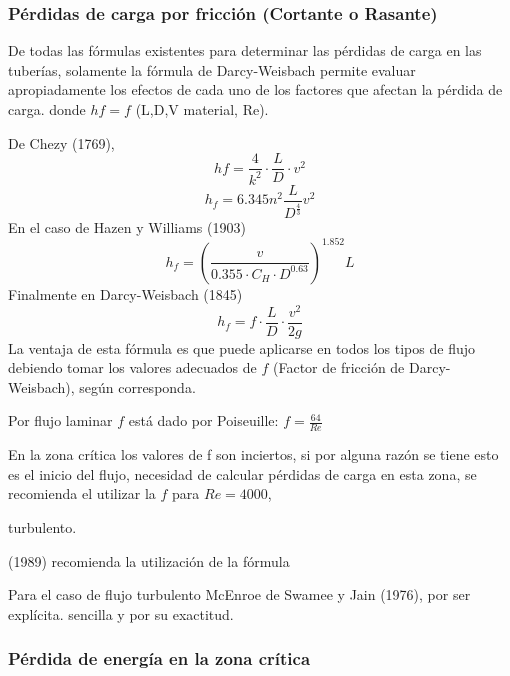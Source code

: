 \subsubsection{Pérdidas de carga por fricción (Cortante o Rasante)}

De todas las fórmulas existentes para determinar las pérdidas de carga en las tuberías, solamente la fórmula de Darcy-Weisbach permite evaluar apropiadamente los efectos de cada uno de los factores que afectan la pérdida de carga.
donde $hf=f$ (L,D,V material, Re).

De Chezy (1769), 
\begin{equation}
    hf = \frac{4}{k^2}\cdot \frac{L}{D}\cdot v^2
\end{equation}
\begin{equation}
    h_f = 6.345n^2 \frac{L}{D^{\frac{4}{3}}}v^2
\end{equation}
En el caso de Hazen y Williams (1903)
\begin{equation}
    h_f =\left(\frac{v}{0.355\cdot C_H\cdot D^{0.63}}\right)^{1.852}L
\end{equation}
Finalmente en Darcy-Weisbach (1845)
\begin{equation}
    h_f = f\cdot \frac{L}{D}\cdot \frac{v^2}{2g}
\end{equation}
La ventaja de esta fórmula es que puede aplicarse en todos los tipos de flujo debiendo tomar los valores adecuados de $f$ (Factor de fricción de Darcy-Weisbach), según corresponda.

Por flujo laminar $f$ está dado por Poiseuille: $f=\frac{64}{Re}$

En la zona crítica los valores de f son inciertos, si por alguna razón se tiene esto es el inicio del flujo, necesidad de calcular pérdidas de carga en esta zona, se recomienda el utilizar la $f$ para $Re=4000$,

turbulento.

(1989) recomienda la utilización de la fórmula

Para el caso de flujo turbulento McEnroe de Swamee y Jain (1976), por ser explícita. sencilla y por su exactitud.

\subsubsection{Pérdida de energía en la zona crítica}

